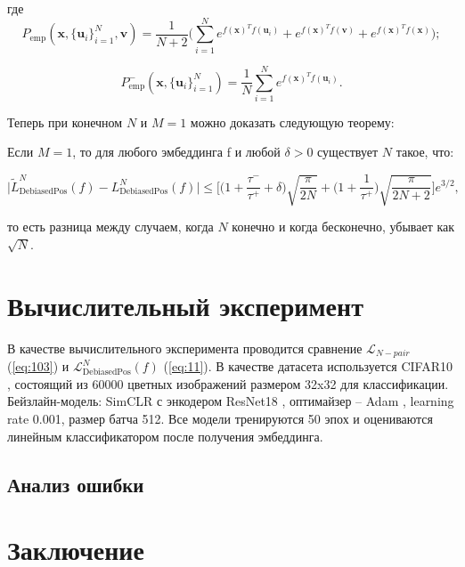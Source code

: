 \documentclass[a4paper, 12pt]{article}
\begin{document}
\noindent где
\begin{equation} \label{eq:12}
P_{\text{emp}} (\textbf{x}, \{\textbf{u}_i\}_{i=1}^N, \textbf{v}) = \frac{1}{N+2} \bigg(\sum \limits_{i=1}^N e^{f(\textbf{x})^T f(\textbf{u}_i)} + e^{f(\textbf{x})^T f(\textbf{v})} + e^{f(\textbf{x})^T f(\textbf{x})}\bigg);
\end{equation}

\begin{equation} \label{eq:13}
P_{\text{emp}}^- (\textbf{x}, \{\textbf{u}_i\}_{i=1}^N) = \frac{1}{N} \sum \limits_{i=1}^N e^{f(\textbf{x})^T f(\textbf{u}_i)}.
\end{equation}

Теперь при конечном $N$ и $M = 1$ можно доказать следующую теорему:

\begin{theorem}
\label{thm:asympt}
Если $M = 1$, то для любого эмбеддинга f и любой $\delta > 0$ существует $N$ такое, что:

\begin{equation} \label{eq:14}
\big|\tilde{L}_{\text{DebiasedPos}}^N(f) - L_{\text{DebiasedPos}}^N(f)\big| \leq \bigg[\bigg(1 + \frac{\tau^-}{\tau^+} + \delta\bigg) \sqrt{\frac{\pi}{2N}} + \bigg(1 + \frac{1}{\tau^+}\bigg) \sqrt{\frac{\pi}{2N + 2}}\bigg] e^{3/2},
\end{equation}

\noindent то есть разница между случаем, когда $N$ конечно и когда бесконечно, убывает как $\sqrt{N}$.
\end{theorem}

\section{Вычислительный эксперимент}

В качестве вычислительного эксперимента проводится сравнение $\mathcal{L}_{N-pair}$ (\ref{eq:103}) и $\mathcal{L}_{\text{DebiasedPos}}^N(f)$ (\ref{eq:11}). В качестве датасета используется CIFAR10 \citep{krizhevsky2009learning}, состоящий из 60000 цветных изображений размером 32x32 для классификации. Бейзлайн-модель: SimCLR \citep{chuang2020debiased} с энкодером ResNet18 \citep{he2015deep}, оптимайзер -- Adam \citep{kingma2017adam}, learning rate 0.001, размер батча 512. Все модели тренируются 50 эпох и оцениваются линейным классификатором после получения эмбеддинга.

\subsection{Анализ ошибки}

\section{Заключение}



\end{document}
